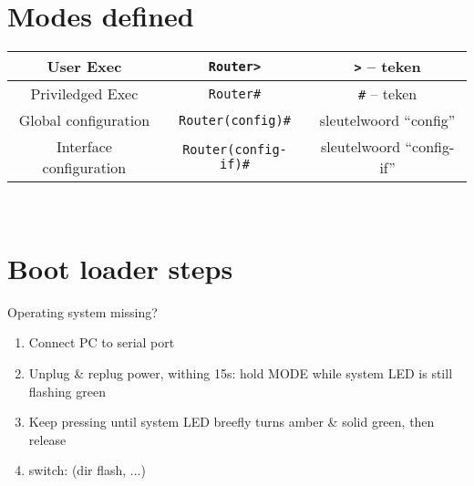 \documentclass[10pt, a4paper]{article}
\begin{document}
	\section{Modes defined}
	\begin{tabular}{|c|c|c|}
		\hline \rule[-1ex]{0pt}{4ex} User Exec & \texttt{Router>} & \texttt{>} -- teken \\
		\hline \rule[-1ex]{0pt}{4ex} Priviledged Exec & \texttt{Router\#} & \texttt{\#} -- teken \\
		\hline \rule[-1ex]{0pt}{4ex} Global configuration & \texttt{Router(config)\#} & sleutelwoord ``config'' \\
		\hline \rule[-1ex]{0pt}{4ex} Interface configuration & \texttt{Router(config-if)\#} & sleutelwoord ``config-if'' \\
		\hline
	\end{tabular} \\

	\section{Boot loader steps}
	Operating system missing?
	\begin{enumerate}
		\item Connect PC to serial port
		\item Unplug \& replug power, withing 15s: hold MODE while system LED is still flashing green
		\item Keep pressing until system LED breefly turns amber \& solid green, then release
		\item switch: (dir flash, ...)
	\end{enumerate}
\end{document}
